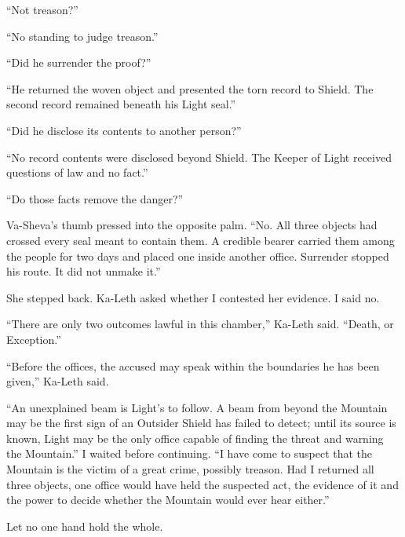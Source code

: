``Not treason?''\par

``No standing to judge treason.''\par

``Did he surrender the proof?''\par

``He returned the woven object and presented the torn record to Shield. The second record remained beneath his Light seal.''\par

``Did he disclose its contents to another person?''\par

``No record contents were disclosed beyond Shield. The Keeper of Light received questions of law and no fact.''\par

``Do those facts remove the danger?''\par

Va-Sheva's thumb pressed into the opposite palm. ``No. All three objects had crossed every seal meant to contain them. A credible bearer carried them among the people for two days and placed one inside another office. Surrender stopped his route. It did not unmake it.''\par

She stepped back. Ka-Leth asked whether I contested her evidence. I said no.\par

``There are only two outcomes lawful in this chamber,'' Ka-Leth said. ``Death, or Exception.''\par

``Before the offices, the accused may speak within the boundaries he has been given,'' Ka-Leth said.\par

``An unexplained beam is Light's to follow. A beam from beyond the Mountain may be the first sign of an Outsider Shield has failed to detect; until its source is known, Light may be the only office capable of finding the threat and warning the Mountain.'' I waited before continuing. ``I have come to suspect that the Mountain is the victim of a great crime, possibly treason. Had I returned all three objects, one office would have held the suspected act, the evidence of it and the power to decide whether the Mountain would ever hear either.''\par

\begin{scripture}
Let no one hand hold the whole.
\end{scripture}

